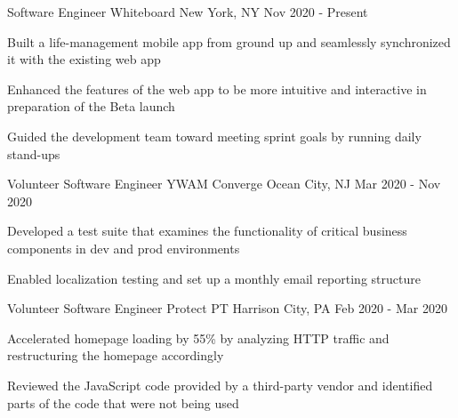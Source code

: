 

\begin{cventries}

\cventry
  {Software Engineer} %
  {Whiteboard} %
  {New York, NY} %
  {Nov 2020 - Present} %
  {
    \begin{cvitems} %
      \item {Built a life-management mobile app from ground up and seamlessly synchronized it with the existing web app}
      \item {Enhanced the features of the web app to be more intuitive and interactive in preparation of the Beta launch}
      \item {Guided the development team toward meeting sprint goals by running daily stand-ups}
    \end{cvitems}
  }

\cventry
  {Volunteer Software Engineer} %
  {YWAM Converge} %
  {Ocean City, NJ} %
  {Mar 2020 - Nov 2020} %
  {
    \begin{cvitems} %
      \item {Developed a test suite that examines the functionality of critical business components in dev and prod environments}
      \item {Enabled localization testing and set up a monthly email reporting structure}
    \end{cvitems}
  }

\cventry
  {Volunteer Software Engineer} %
  {Protect PT} %
  {Harrison City, PA} %
  {Feb 2020 - Mar 2020} %
  {
    \begin{cvitems} %
      \item {Accelerated homepage loading by 55\% by analyzing HTTP traffic and restructuring the homepage accordingly}
      \item {Reviewed the JavaScript code provided by a third-party vendor and identified parts of the code that were not being used}
    \end{cvitems}
  }


\end{cventries}
